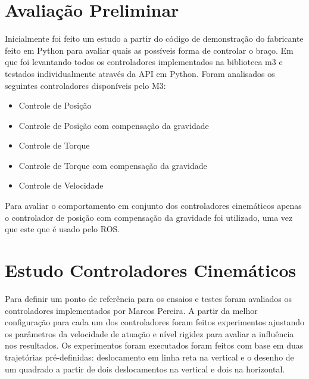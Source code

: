 

\section{Avaliação Preliminar}

Inicialmente foi feito um estudo a partir do código de demonstração do fabricante feito em Python para avaliar quais as possíveis forma de controlar o braço. Em que foi levantando todos os controladores implementados na biblioteca m3 e testados individualmente através da API em Python. Foram analisados os seguintes controladores disponíveis pelo M3:

\begin{itemize}
    \item Controle de Posição
    \item Controle de Posição com compensação da gravidade
    \item Controle de Torque
    \item Controle de Torque com compensação da gravidade
    \item Controle de Velocidade
\end{itemize}


Para avaliar o comportamento em conjunto dos controladores cinemáticos apenas o controlador de posição com compensação da gravidade foi utilizado, uma vez que este que é usado pelo ROS.

\section{Estudo Controladores Cinemáticos}

Para definir um ponto de referência para os ensaios e testes foram avaliados os controladores implementados por Marcos Pereira. A partir da melhor configuração para cada um dos controladores foram feitos experimentos ajustando os parâmetros da velocidade de atuação e nível rigidez para avaliar a influência nos resultados. Os experimentos foram executados foram feitos com base em duas trajetórias pré-definidas: deslocamento em linha reta na vertical e o desenho de um quadrado a partir de dois deslocamentos na vertical e dois na horizontal.

